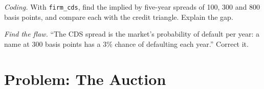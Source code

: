 \begin{exercise}[$\star\star\star$]\label{exo:m2:credit-default-swaps:7}
\emph{Coding.} With \texttt{firm\_cds}, find the  implied by five-year
spreads of 100, 300 and 800 basis points, and compare each with the credit triangle.
Explain the gap.
\end{exercise}

\begin{exercise}[$\star\star\star$]\label{exo:m2:credit-default-swaps:8}
\emph{Find the flaw.} ``The CDS spread is the market's probability of default per
year: a name at 300 basis points has a 3\% chance of defaulting each year.'' Correct it.
\end{exercise}

\section{Problem: The Auction}

